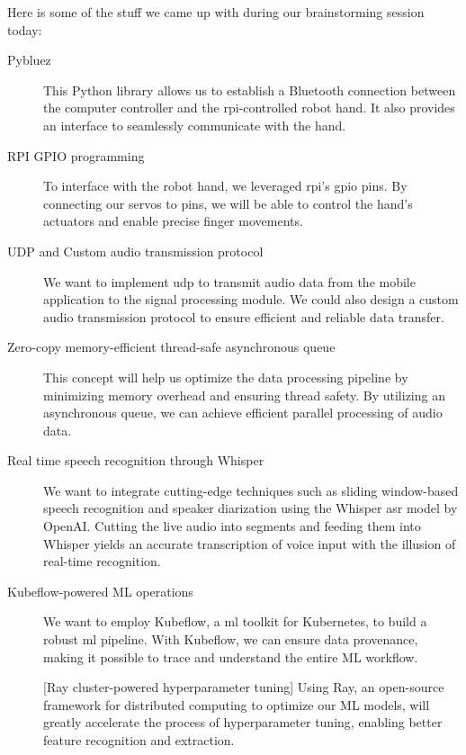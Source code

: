 Here is some of the stuff we came up with during our brainstorming session today:
\begin{description}
\item[Pybluez] This Python library allows us to establish a Bluetooth connection between the computer controller and the \gls{rpi}-controlled robot hand. It also provides an interface to seamlessly communicate with the hand.

\item[RPI GPIO programming] To interface with the robot hand, we leveraged \gls{rpi}'s \gls{gpio} pins. By connecting our servos to pins, we will be able to control the hand's actuators and enable precise finger movements.

\item[UDP and Custom audio transmission protocol] We want to implement \gls{udp} to transmit audio data from the mobile application to the signal processing module. We could also design a custom audio transmission protocol to ensure efficient and reliable data transfer.

\item[Zero-copy memory-efficient thread-safe asynchronous queue] This concept will help us optimize the data processing pipeline by minimizing memory overhead and ensuring thread safety. By utilizing an asynchronous queue, we can achieve efficient parallel processing of audio data.

\item[Real time speech recognition through Whisper] We want to integrate cutting-edge techniques such as sliding window-based speech recognition and speaker diarization using the Whisper \gls{asr} model by OpenAI. Cutting the live audio into segments and feeding them into Whisper yields an accurate transcription of voice input with the illusion of real-time recognition.

\item[Kubeflow-powered ML operations] We want to employ Kubeflow, a \gls{ml} toolkit for Kubernetes, to build a robust \gls{ml} pipeline. With Kubeflow, we can ensure data provenance, making it possible to trace and understand the entire ML workflow.

[Ray cluster-powered hyperparameter tuning] Using Ray, an open-source framework for distributed computing to optimize our ML models, will greatly accelerate the process of hyperparameter tuning, enabling better feature recognition and extraction.
\end{description}


